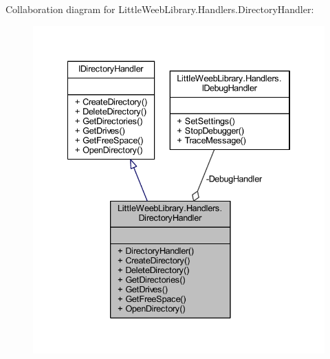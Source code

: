 Collaboration diagram for Little\+Weeb\+Library.\+Handlers.\+Directory\+Handler\+:\nopagebreak
\begin{figure}[H]
\begin{center}
\leavevmode
\includegraphics[width=334pt]{class_little_weeb_library_1_1_handlers_1_1_directory_handler__coll__graph}
\end{center}
\end{figure}

